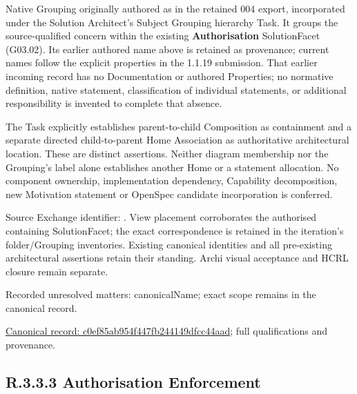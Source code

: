 Native Grouping originally authored as \texttt{} in the retained 004 export,
incorporated under the Solution Architect's Subject Grouping hierarchy Task.
It groups the source-qualified \texttt{} concern within
the existing \textbf{Authorisation} SolutionFacet (G03.02). Its earlier authored name above is retained as provenance; current names
follow the explicit properties in the 1.1.19 submission.
That earlier incoming record has no Documentation or authored Properties; no normative
definition, native statement, classification of individual statements, or
additional responsibility is invented to complete that absence.



The Task explicitly establishes parent-to-child Composition as containment and
a separate directed child-to-parent Home Association as authoritative architectural
location. These are distinct assertions. Neither diagram membership nor the
Grouping's label alone establishes another Home or a statement allocation.
No component ownership, implementation dependency, Capability decomposition,
new Motivation statement or OpenSpec candidate incorporation is conferred.



Source Exchange identifier: \texttt{}. View placement corroborates
the authorised containing SolutionFacet; the exact correspondence is retained in the
iteration's folder/Grouping inventories. Existing canonical identities and all
pre-existing architectural assertions retain their standing. Archi visual
acceptance and HCRL closure remain separate.


{\small Recorded unresolved matters: canonicalName; exact scope remains in the canonical record.}\par
{\footnotesize \href{../../../../../../../continuum/grouping/c0ef85ab954f447fb244149dfcc44aad.md}{Canonical record: c0ef85ab954f447fb244149dfcc44aad}; full qualifications and provenance.}\par
\subsection*{R.3.3.3 Authorisation Enforcement}
\label{navigation:R.3.3.3}

